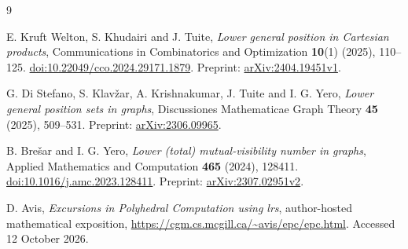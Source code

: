 \documentclass[11pt]{article}
\theoremstyle{definition}
\theoremstyle{remark}
\begin{document}
\begin{thebibliography}{9}
\raggedright

E. Kruft Welton, S. Khudairi and J. Tuite,
\emph{Lower general position in Cartesian products},
Communications in Combinatorics and Optimization \textbf{10}(1) (2025), 110--125.
\href{https://doi.org/10.22049/cco.2024.29171.1879}{doi:10.22049/cco.2024.29171.1879}.
Preprint: \href{https://arxiv.org/abs/2404.19451v1}{arXiv:2404.19451v1}.

G. Di Stefano, S. Klav\v{z}ar, A. Krishnakumar, J. Tuite and I. G. Yero,
\emph{Lower general position sets in graphs},
Discussiones Mathematicae Graph Theory \textbf{45} (2025), 509--531.
Preprint: \href{https://arxiv.org/abs/2306.09965}{arXiv:2306.09965}.

B. Bre\v{s}ar and I. G. Yero,
\emph{Lower (total) mutual-visibility number in graphs},
Applied Mathematics and Computation \textbf{465} (2024), 128411.
\href{https://doi.org/10.1016/j.amc.2023.128411}{doi:10.1016/j.amc.2023.128411}.
Preprint: \href{https://arxiv.org/abs/2307.02951v2}{arXiv:2307.02951v2}.

D. Avis,
\emph{Excursions in Polyhedral Computation using lrs},
author-hosted mathematical exposition,
\url{https://cgm.cs.mcgill.ca/~avis/epc/epc.html}.
Accessed 12 October 2026.

\end{thebibliography}
\end{document}
